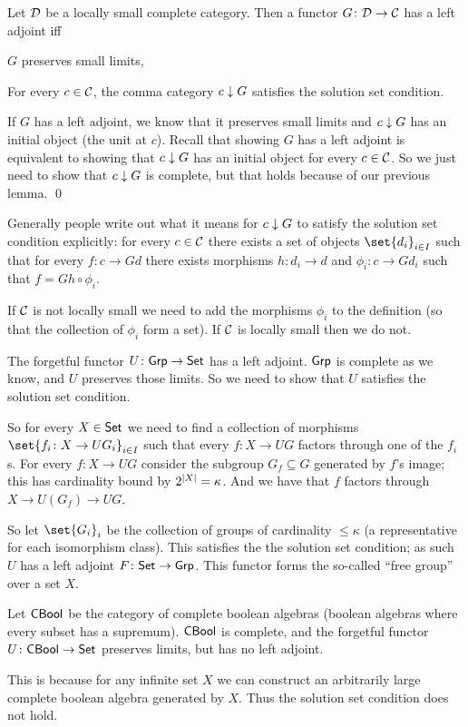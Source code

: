 \eproof

\bthrm

    Let ${{\cal D}}$ be a locally small complete category.
    Then a functor $G\colon{{\cal D}}\to{{\cal C}}$ has a left adjoint iff
    \benum
        \item $G$ preserves small limits,
        \item For every $c\in{{\cal C}}$, the comma category $c\downarrow G$ satisfies the solution set condition.
    \eenum

\ethrm

\bproof

    If $G$ has a left adjoint, we know that it preserves small limits and $c\downarrow G$ has an initial object (the unit at $c$).
    Recall that showing $G$ has a left adjoint is equivalent to showing that $c\downarrow G$ has an initial object for every $c\in{{\cal C}}$.
    So we just need to show that $c\downarrow G$ is complete, but that holds because of our previous lemma.
    \qed

\eproof

Generally people write out what it means for $c\downarrow G$ to satisfy the solution set condition explicitly: for every $c\in{{\cal C}}$ there exists a set of objects $\set{d_i}_{i\in I}$
such that for every $f\colon c\to Gd$ there exists morphisms $h\colon d_i\to d$ and $\phi_i\colon c\to Gd_i$ such that $f=Gh\circ\phi_i$.

If ${{\cal C}}$ is not locally small we need to add the morphisms $\phi_i$ to the definition (so that the collection of $\phi_i$ form a set).
If ${{\cal C}}$ is locally small then we do not.

\bexam

    The forgetful functor $U\colon{\sf Grp}\to{\sf Set}$ has a left adjoint.
    ${\sf Grp}$ is complete as we know, and $U$ preserves those limits.
    So we need to show that $U$ satisfies the solution set condition.

    So for every $X\in{\sf Set}$ we need to find a collection of morphisms $\set{f_i\colon X\to UG_i}_{i\in I}$ such that every $f\colon X\to UG$ factors through one of the $f_i$s.
    For every $f\colon X\to UG$ consider the subgroup $G_f\subseteq G$ generated by $f$'s image; this has cardinality bound by $2^{\mathopen{}\mathclose{\left|X\right|}}=\kappa$.
    And we have that $f$ factors through $X\to U(G_f)\to UG$.

    So let $\set{G_i}_i$ be the collection of groups of cardinality $\leq\kappa$ (a representative for each isomorphism class).
    This satisfies the the solution set condition; as such $U$ has a left adjoint $F\colon{\sf Set}\to{\sf Grp}$.
    This functor forms the so-called ``free group'' over a set $X$.

\eexam

\bexam

    Let ${\sf CBool}$ be the category of complete boolean algebras (boolean algebras where every subset has a supremum).
    ${\sf CBool}$ is complete, and the forgetful functor $U\colon{\sf CBool}\to{\sf Set}$ preserves limits, but has no left adjoint.

    This is because for any infinite set $X$ we can construct an arbitrarily large complete boolean algebra generated by $X$.
    Thus the solution set condition does not hold.

\eexam

